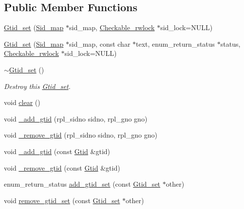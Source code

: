 \subsection*{Public Member Functions}
\begin{DoxyCompactItemize}
\item 
\mbox{\hyperlink{classGtid__set_a048d3934c095e4afed99055334367047}{Gtid\+\_\+set}} (\mbox{\hyperlink{classSid__map}{Sid\+\_\+map}} $\ast$sid\+\_\+map, \mbox{\hyperlink{classCheckable__rwlock}{Checkable\+\_\+rwlock}} $\ast$sid\+\_\+lock=N\+U\+LL)
\item 
\mbox{\hyperlink{classGtid__set_a3f441c71a9465b3e03fc2d8a68a04315}{Gtid\+\_\+set}} (\mbox{\hyperlink{classSid__map}{Sid\+\_\+map}} $\ast$sid\+\_\+map, const char $\ast$text, enum\+\_\+return\+\_\+status $\ast$status, \mbox{\hyperlink{classCheckable__rwlock}{Checkable\+\_\+rwlock}} $\ast$sid\+\_\+lock=N\+U\+LL)
\item 
\mbox{\label{classGtid__set_ad214bab2852c98a3b0ce39bb305f720f}} 
\mbox{\hyperlink{classGtid__set_ad214bab2852c98a3b0ce39bb305f720f}{$\sim$\+Gtid\+\_\+set}} ()
\begin{DoxyCompactList}\small\item\em Destroy this \mbox{\hyperlink{classGtid__set}{Gtid\+\_\+set}}. \end{DoxyCompactList}\item 
void \mbox{\hyperlink{classGtid__set_a8d8130a7559cfd7b940f42e66c9b171a}{clear}} ()
\item 
void \mbox{\hyperlink{classGtid__set_aba662ba6a9761b9b0c21473aecc27a1b}{\+\_\+add\+\_\+gtid}} (rpl\+\_\+sidno sidno, rpl\+\_\+gno gno)
\item 
void \mbox{\hyperlink{classGtid__set_aed076ca0f25c0c25c718abe4cc5c27ed}{\+\_\+remove\+\_\+gtid}} (rpl\+\_\+sidno sidno, rpl\+\_\+gno gno)
\item 
void \mbox{\hyperlink{classGtid__set_afbd9dcbc89a4d8c7a3ab9c518302039b}{\+\_\+add\+\_\+gtid}} (const \mbox{\hyperlink{structGtid}{Gtid}} \&gtid)
\item 
void \mbox{\hyperlink{classGtid__set_add6998be8ef93e04caca93692e755826}{\+\_\+remove\+\_\+gtid}} (const \mbox{\hyperlink{structGtid}{Gtid}} \&gtid)
\item 
enum\+\_\+return\+\_\+status \mbox{\hyperlink{classGtid__set_a5a76ae688b1286b8bc51b02619174892}{add\+\_\+gtid\+\_\+set}} (const \mbox{\hyperlink{classGtid__set}{Gtid\+\_\+set}} $\ast$other)
\item 
void \mbox{\hyperlink{classGtid__set_a6ed8e71d84efbc22bc589897b7318751}{remove\+\_\+gtid\+\_\+set}} (const \mbox{\hyperlink{classGtid__set}{Gtid\+\_\+set}} $\ast$other)

\end{DoxyCompactItemize}
